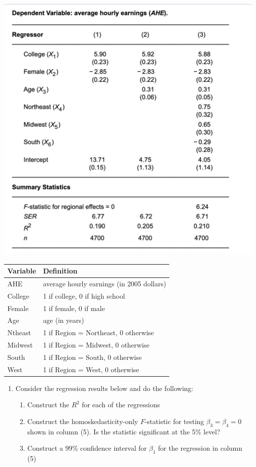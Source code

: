 \documentclass[
]{article}
\providecommand{\tightlist}{%
  \setlength{\itemsep}{0pt}\setlength{\parskip}{0pt}}
\begin{document}
\centering\includegraphics[scale=0.5]{materials/sw7-3.png}

\begin{longtable}[]{@{}ll@{}}
\toprule
Variable & Definition\tabularnewline
\midrule
\endhead
AHE & average hourly earnings (in 2005 dollars)\tabularnewline
College & 1 if college, 0 if high school\tabularnewline
Female & 1 if female, 0 if male\tabularnewline
Age & age (in years)\tabularnewline
Ntheast & 1 if Region = Northeast, 0 otherwise\tabularnewline
Midwest & 1 if Region = Midwest, 0 otherwise\tabularnewline
South & 1 if Region = South, 0 otherwise\tabularnewline
West & 1 if Region = West, 0 otherwise\tabularnewline
\bottomrule
\end{longtable}

\begin{enumerate}
\def\labelenumi{\arabic{enumi}.}
\setcounter{enumi}{4}
\tightlist
\item
  Consider the regression results below and do the following:

  \begin{enumerate}
  \def\labelenumii{\alph{enumii}.}
  \tightlist
  \item
    Construct the \(R^2\) for each of the regressions
  \item
    Construct the homoskedasticity-only \(F\)-statistic for testing
    \(\beta_3 = \beta_4 = 0\) shown in column (5). Is the statistic
    significant at the 5\% level?
  \item
    Construct a 99\% confidence interval for \(\beta_1\) for the
    regression in column (5)
  \end{enumerate}
\end{enumerate}
\end{document}
